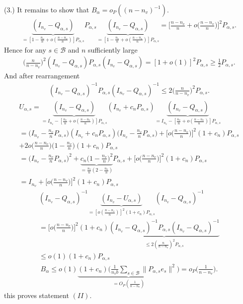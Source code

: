 \documentclass[Research_Module_ES.tex]{subfiles}
\begin{document}
(3.) It remains to show that $B_\alpha = o_P((n-n_v)^{-1})$.
\begin{align*}
\underbrace{(I_{n_v}-Q_{\alpha,s})}_{=[1-\frac{n_v}{n}+o(\frac{n-n_v}{n})]P_{\alpha,s}} P_{\alpha,s}\underbrace{(I_{n_v}-Q_{\alpha,s})}_{=[1-\frac{n_v}{n}+o(\frac{n-n_v}{n})]P_{\alpha,s}} =\biggl[\frac{n-n_v}{n}+o\biggl(\frac{n-n_v}{n}\biggr)\biggr]^2 P_{\alpha,s}.
\end{align*}
Hence for any $s\in \mathcal{B}$ and $n$ sufficiently large
\begin{align*}
\biggl(\frac{n}{n-n_v}\biggr)^2 (I_{n_v}-Q_{\alpha,s})P_{\alpha,s}(I_{n_v}-Q_{\alpha,s})=[1+o(1)]^2P_{\alpha,s}\ge \frac{1}{2}P_{\alpha,s}.
\end{align*}
And after rearrangement
\begin{align*}
(I_{n_v}-Q_{\alpha,s})^{-1}P_{\alpha,s}(I_{n_v}-Q_{\alpha,s})^{-1}\le 2 \biggl(\frac{n}{n-n_v}\biggr)^2P_{\alpha,s}.
\end{align*}
\begin{align*}
U_{\alpha,s} = \underbrace{(I_{n_v}-Q_{\alpha,s})}_{=I_{n_v}-[\frac{n_v}{n}+o(\frac{n-n_v}{n})]P_{\alpha,s}}(I_{n_v}+c_n P_{\alpha,s})\underbrace{(I_{n_v}-Q_{\alpha,s})}_{=I_{n_v}-[\frac{n_v}{n}+o(\frac{n-n_v}{n})]P_{\alpha,s}}\\
=\biggl(I_{n_v}-\frac{n_v}{n}P_{\alpha,s}\biggr)(I_{n_v}+c_n P_{\alpha,s})\biggl(I_{n_v}-\frac{n_v}{n}P_{\alpha,s}\biggr)
+\biggl[o\biggl(\frac{n-n_v}{n}\biggr)\biggr]^2(1+c_n)P_{\alpha,s} \\
+ 2o\biggl(\frac{n-n_v}{n}\biggr)\biggl(1-\frac{n_v}{n}\biggr)(1+c_n)P_{\alpha,s}\\
=\biggl(I_{n_v}-\frac{n_v}{n}P_{\alpha,s}\biggr)^2+\underbrace{c_n\biggl(1-\frac{n_v}{n}\biggr)^2}_{=\frac{n_v}{n}(2-\frac{n_v}{n})}P_{\alpha,s}+\biggl[o\biggl(\frac{n-n_v}{n}\biggr)\biggr]^2(1+c_n)P_{\alpha,s}\\
=I_{n_v} +\biggl[o\biggl(\frac{n-n_v}{n}\biggr)\biggr]^2(1+c_n)P_{\alpha,s}
\end{align*}
\begin{align*}
(I_{n_v}-Q_{\alpha,s})^{-1}\underbrace{(I_{n_v}-U_{\alpha,s})}_{=[o(\frac{n-n_v}{n})]^2(1+c_n)P_{\alpha,s}}(I_{n_v}-Q_{\alpha,s})^{-1}\\
=\biggl[o\biggl(\frac{n-n_v}{n}\biggr)\biggr]^2(1+c_n)\underbrace{(I_{n_v}-Q_{\alpha,s})^{-1}P_{\alpha,s}(I_{n_v}-Q_{\alpha,s})^{-1}}_{\le 2(\frac{n}{n-n_v})^2P_{\alpha,s}}\\
\le o(1)(1+c_n)P_{\alpha,s}
\end{align*}
\begin{align*}
B_\alpha \le o(1)\underbrace{(1+c_n)\biggl(\frac{1}{n_vb}\sum_{s\in \mathcal{B}}\lVert P_{\alpha,s}e_s\rVert^2\biggr)}_{=O_P(\frac{1}{n-n_v})}=o_P\biggl(\frac{1}{n-n_v}\biggr).
\end{align*}
this proves statement $(II)$.\\
\end{document}
